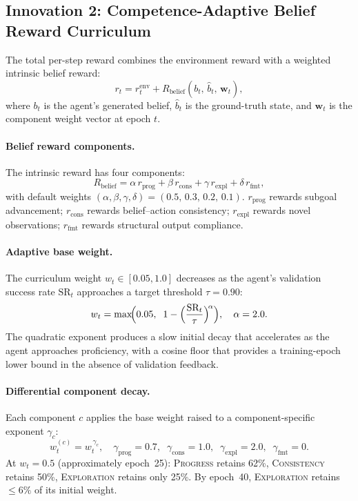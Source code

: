 \documentclass{article}
\begin{document}
\subsection{Innovation 2: Competence-Adaptive Belief Reward Curriculum}
\label{sec:curriculum}

The total per-step reward combines the environment reward with a weighted
intrinsic belief reward:
\begin{equation}
  r_t = r_t^{\text{env}} + R_{\text{belief}}(b_t,\, \hat{b}_t,\, \mathbf{w}_t),
  \label{eq:reward}
\end{equation}
where $b_t$ is the agent's generated belief, $\hat{b}_t$ is the ground-truth
state, and $\mathbf{w}_t$ is the component weight vector at epoch $t$.

\paragraph{Belief reward components.}
The intrinsic reward has four components:
\begin{equation}
  R_{\text{belief}} =
    \alpha \,r_{\text{prog}} +
    \beta  \,r_{\text{cons}} +
    \gamma \,r_{\text{expl}} +
    \delta \,r_{\text{fmt}},
  \label{eq:belief_reward}
\end{equation}
with default weights $(\alpha,\beta,\gamma,\delta) = (0.5,\, 0.3,\, 0.2,\, 0.1)$.
$r_{\text{prog}}$ rewards subgoal advancement; $r_{\text{cons}}$ rewards
belief--action consistency; $r_{\text{expl}}$ rewards novel observations;
$r_{\text{fmt}}$ rewards structural output compliance.

\paragraph{Adaptive base weight.}
The curriculum weight $w_t \in [0.05, 1.0]$ decreases as the agent's
validation success rate $\text{SR}_t$ approaches a target threshold
$\tau = 0.90$:
\begin{equation}
  w_t = \max\!\Bigl(0.05,\;\; 1 - \Bigl(\frac{\text{SR}_t}{\tau}\Bigr)^{\!\alpha}\Bigr),
  \quad \alpha = 2.0.
  \label{eq:adaptive_weight}
\end{equation}
The quadratic exponent produces a slow initial decay that accelerates as the
agent approaches proficiency, with a cosine floor that provides a
training-epoch lower bound in the absence of validation feedback.

\paragraph{Differential component decay.}
Each component $c$ applies the base weight raised to a component-specific
exponent $\gamma_c$:
\begin{equation}
  w_t^{(c)} = w_t^{\,\gamma_c},
  \quad
  \gamma_{\text{prog}} = 0.7,\;\;
  \gamma_{\text{cons}} = 1.0,\;\;
  \gamma_{\text{expl}} = 2.0,\;\;
  \gamma_{\text{fmt}} = 0.
  \label{eq:differential}
\end{equation}
At $w_t = 0.5$ (approximately epoch~25): \textsc{Progress} retains 62\%,
\textsc{Consistency} retains 50\%, \textsc{Exploration} retains only 25\%.
By epoch~40, \textsc{Exploration} retains $\leq 6\%$ of its initial weight.
\end{document}
